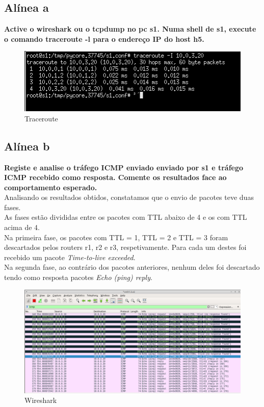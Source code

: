 \documentclass[a4paper]{report}
\begin{document}
\subsection{Alínea a}
\textbf{Active o wireshark ou o tcpdump no pc s1. Numa shell de s1, execute o
comando traceroute -l para o endereço IP do host h5.}

\begin{figure}[H]
    \centering 
    \includegraphics[width=\textwidth]{images/traceroutEx1.png}  
    \caption{Traceroute}
    \label{fig:traceroutEx1}
\end{figure}
\subsection{Alínea b}
\textbf{Registe e analise o tráfego ICMP enviado enviado por s1 e tráfego ICMP
recebido como resposta. Comente os resultados face ao comportamento esperado.}\\
Analisando os resultados obtidos, constatamos que o envio de pacotes teve duas
fases.\\
As fases estão divididas entre os pacotes com TTL abaixo de 4 e os com TTL acima
de 4.\\
Na primeira fase, os pacotes com TTL = 1, TTL = 2 e TTL = 3 foram descartados
pelos routers r1, r2 e r3, respetivamente. Para cada um destes foi recebido um
pacote \textit{Time-to-live exceeded}.\\
Na segunda fase, ao contrário dos pacotes anteriores, nenhum deles foi
descartado tendo como resposta pacotes \textit{Echo (ping) reply}.

\begin{figure}[H]
    \centering 
    \includegraphics[width=\textwidth]{images/wiresharkEx1.png}  
    \caption{Wireshark}
    \label{fig:wiresharkEx1}
\end{figure}
\end{document}
